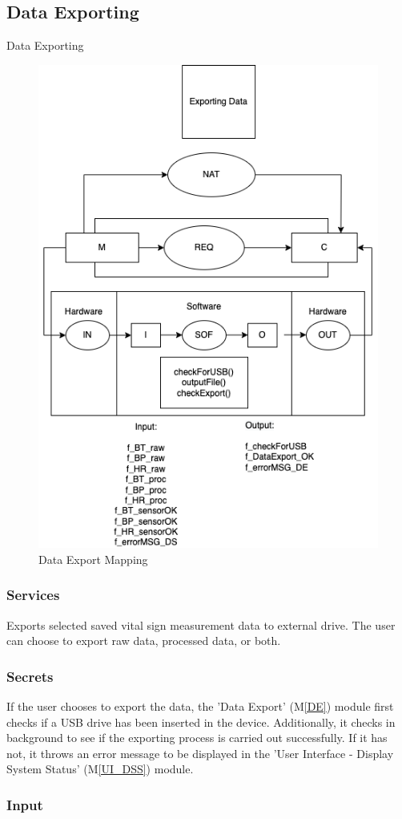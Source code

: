 \documentclass{article}
\newcounter{mnum}
\newcommand{\mthemnum}{M\themnum}
\begin{document}
\begin{description}
    \subsection{Data Exporting}
    \item [\refstepcounter{mnum} \mthemnum \label{DE}:] Data Exporting
    \begin{figure}[!htb]
    	\centering
    	\includegraphics[width=0.5\linewidth]{mccharts-DataExport.drawio.png}
    	\caption{Data Export Mapping}
    \end{figure}
        \subsubsection{Services}
        Exports selected saved vital sign measurement data to external drive. The user can choose to export raw data, processed data, or both. 
        \subsubsection{Secrets}
         If the user chooses to export the data, the 'Data Export' (M\ref{DE}) module first checks if a USB drive has been inserted in the device. Additionally, it checks in background to see if the exporting process is carried out successfully. If it has not, it throws an error message to be displayed in the 'User Interface - Display System Status' (M\ref{UI_DSS}) module.  
        \subsubsection{Input}
            

\end{description}
\end{document}
